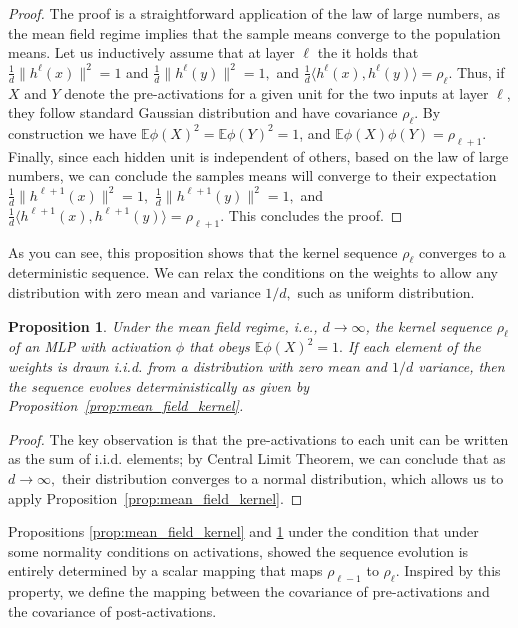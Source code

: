 \documentclass[twoside]{article}
\newcommand{\E}{\mathbb{E}}
\newtheorem{proposition}{Proposition}
\theoremstyle{definition}
\begin{document}
\begin{proof}
 The proof is a straightforward application of the law of large numbers, as the mean field regime implies that the sample means converge to the population means. Let us inductively assume that at layer $\ell$ the it holds that $\frac1d\|h^{\ell}(x)\|^2 = 1$ and $\frac1d\|h^{\ell}(y)\|^2=1,$ and $\frac1d\langle h^{\ell}(x),h^{\ell}(y)\rangle = \rho_{\ell}$. Thus, if $X$ and $Y$ denote the pre-activations for a given unit for the two inputs at layer $\ell$, they follow standard Gaussian distribution and have covariance $\rho_{\ell}.$ By construction we have $\E \phi(X)^2 = \E \phi(Y)^2 = 1$, and $\E \phi(X)\phi(Y) = \rho_{\ell+1}.$ Finally, since each hidden unit is independent of others, based on the law of large numbers, we can conclude the samples means will converge to their expectation $\frac1d \|h^{\ell+1}(x)\|^2 = 1, $ $\frac1d \|h^{\ell+1}(y)\|^2 = 1,$ and $\frac1d \langle h^{\ell+1}(x),h^{\ell+1}(y)\rangle = \rho_{\ell+1}. $ This concludes the proof. 
\end{proof}

As you can see, this proposition shows that the kernel sequence $\rho_\ell$ converges to a deterministic sequence. We can relax the conditions on the weights to allow any distribution with zero mean and variance $1/d,$ such as uniform distribution. 

\begin{proposition}
\label{prop:mean_field_kernel_general}
Under the mean field regime, i.e., $d \to \infty$, the kernel sequence $\rho_\ell$ of an MLP with activation $\phi$ that obeys $\E \phi(X)^2=1.$ If each element of the weights is drawn i.i.d. from a distribution with zero mean and $1/d$ variance, then the sequence evolves deterministically as given by Proposition~\ref{prop:mean_field_kernel}.
\end{proposition}

\begin{proof}
 The key observation is that the pre-activations to each unit can be written as the sum of i.i.d. elements; by Central Limit Theorem, we can conclude that as $d\to\infty,$ their distribution converges to a normal distribution, which allows us to apply Proposition~\ref{prop:mean_field_kernel}.
\end{proof}




Propositions \ref{prop:mean_field_kernel} and \ref{prop:mean_field_kernel_general} under the condition that under some normality conditions on activations,  showed the sequence evolution is entirely determined by a scalar mapping that maps $\rho_{\ell-1}$ to $\rho_\ell.$
Inspired by this property, we define the mapping between the covariance of pre-activations and the covariance of post-activations.
\end{document}
